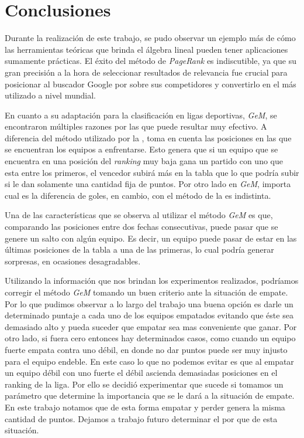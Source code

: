 \section{Conclusiones}

	Durante la realización de este trabajo, se pudo observar un ejemplo más de cómo las herramientas teóricas que brinda el álgebra lineal pueden tener aplicaciones sumamente prácticas. El éxito del método de \emph{PageRank} es indiscutible, ya que su gran precisión a la hora de seleccionar resultados de relevancia fue crucial para posicionar al buscador Google por sobre sus competidores y convertirlo en el más utilizado a nivel mundial.

	En cuanto a su adaptación para la clasificación en ligas deportivas, \emph{GeM}, se encontraron múltiples razones por las que puede resultar muy efectivo. A diferencia del método utilizado por la , toma en cuenta las posiciones en las que se encuentran los equipos a enfrentarse. Esto genera que si un equipo que se encuentra en una posición del \emph{ranking} muy baja gana un partido con uno que esta entre los primeros, el vencedor subirá más en la tabla que lo que podría subir si le dan solamente una cantidad fija de puntos. Por otro lado en \emph{GeM}, importa cual es la diferencia de goles, en cambio, con el método de la  es indistinta.

	Una de las características que se observa al utilizar el método \emph{GeM} es que, comparando las posiciones entre dos fechas consecutivas, puede pasar que se genere un salto con algún equipo. Es decir, un equipo puede pasar de estar en las últimas posiciones de la tabla a una de las primeras, lo cual podría generar sorpresas, en ocasiones desagradables.

	Utilizando la información que nos brindan los experimentos realizados, podríamos corregir el método \emph{GeM} tomando un buen criterio ante la situación de empate. Por lo que pudimos observar a lo largo del trabajo una buena opción es darle un determinado puntaje a cada uno de los equipos empatados evitando que éste sea demasiado alto y pueda suceder que empatar sea mas conveniente que ganar. Por otro lado, si fuera cero entonces hay determinados casos, como cuando un equipo fuerte empata contra uno débil, en donde no dar puntos puede ser muy injusto para el equipo endeble. En este caso lo que no podemos evitar es que al empatar un equipo débil con uno fuerte el débil ascienda demasiadas posiciones en el ranking de la liga. Por ello se decidió experimentar que sucede si tomamos un parámetro que determine la importancia que se le dará a la situación de empate. En este trabajo notamos que de esta forma empatar y perder genera la misma cantidad de puntos. Dejamos a trabajo futuro determinar el por que de esta situación. 
	
